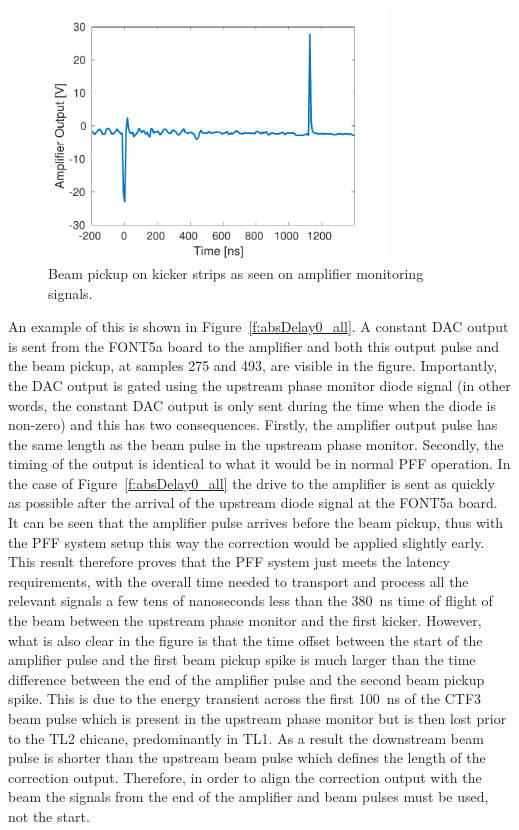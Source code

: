 \begin{figure}
  \centering
  \includegraphics[width=0.8\textwidth]{Figures/commissioning/beamPickup_noKick}
  \caption{Beam pickup on kicker strips as seen on amplifier monitoring signals.}
  \label{f:beamPickup_noKick}
\end{figure}

An example of this is shown in Figure~\ref{f:absDelay0_all}. A constant DAC output is sent from the FONT5a board to the amplifier and both this output pulse and the beam pickup, at samples 275 and 493, are visible in the figure. Importantly, the DAC output is gated using the upstream phase monitor diode signal (in other words, the constant DAC output is only sent during the time when the diode is non-zero) and this has two consequences. Firstly, the amplifier output pulse has the same length as the beam pulse in the upstream phase monitor. Secondly, the timing of the output is identical to what it would be in normal PFF operation. In the case of Figure~\ref{f:absDelay0_all} the drive to the amplifier is sent as quickly as possible after the arrival of the upstream diode signal at the FONT5a board. It can be seen that the amplifier pulse arrives before the beam pickup, thus with the PFF system setup this way the correction would be applied slightly early. This result therefore proves that the PFF system just meets the latency requirements, with the overall time needed to transport and process all the relevant signals a few tens of nanoseconds less than the 380~ns time of flight of the beam between the upstream phase monitor and the first kicker. However, what is also clear in the figure is that the time offset between the start of the amplifier pulse and the first beam pickup spike is much larger than the time difference between the end of the amplifier pulse and the second beam pickup spike. This is due to the energy transient across the first 100~ns of the CTF3 beam pulse which is present in the upstream phase monitor but is then lost prior to the TL2 chicane, predominantly in TL1. As a result the downstream beam pulse is shorter than the upstream beam pulse which defines the length of the correction output. Therefore, in order to align the correction output with the beam the signals from the end of the amplifier and beam pulses must be used, not the start.

